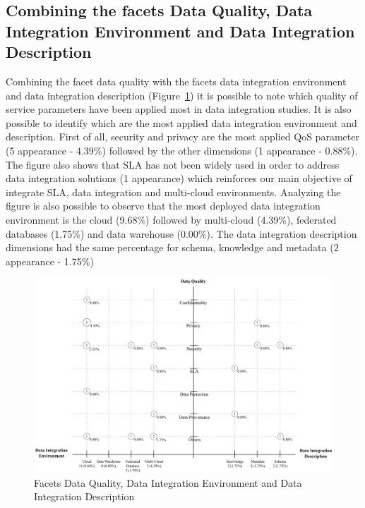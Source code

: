 \subsection{Combining the facets Data Quality, Data Integration Environment and Data Integration Description}

Combining the facet data quality with the facets data integration environment and data integration description
(Figure~\ref{fig:facet4}) it is possible to note which quality of service parameters have been applied most in
data integration studies.
It is also possible to identify which are the most applied data integration environment and description.
First of all, security and privacy are the most applied QoS parameter (5 appearance - 4.39\%)
followed by the other dimensions (1 appearance - 0.88\%). 
The figure also shows that SLA has not been widely used in order to address data integration solutions
(1 appearance) which reinforces our main objective of integrate SLA, data integration and multi-cloud 
environments. 
Analyzing the figure is also possible to observe that the most deployed data integration environment is 
the cloud (9.68\%) followed by multi-cloud (4.39\%), federated databases (1.75\%) and data warehouse (0.00\%).
The data integration description dimensions had the same percentage for schema, knowledge and metadata (2 appearance - 1.75\%)

\begin{figure}[!h]
\centering
\includegraphics[scale=0.53]{figs/bubble-charts/Data-Quality-DI.pdf}
\caption{Facets Data Quality, Data Integration Environment and Data Integration Description}\label{fig:facet4}
\end{figure}
